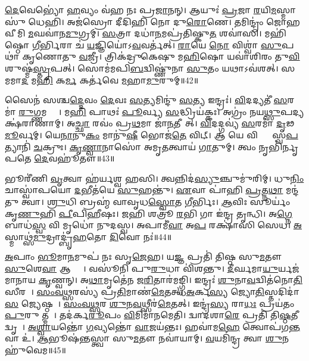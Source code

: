 \ul{𑌦𑍇}𑌵𑍇𑌭𑍍𑌯𑍋॑ \ul{𑌹}𑌵𑍍𑌯𑌂 𑌵॑𑌹 𑌨𑌃 𑌪𑍍𑌰\ul{𑌜𑌾}𑌨𑌨𑍍।
𑌆𑌯𑍁𑌃॑ \ul{𑌪𑍍𑌰}𑌜𑌾 \ul{𑌰}𑌯𑌿\ul{𑌮}𑌸𑍍𑌮𑌾𑌸𑍁॑ 𑌧𑍇𑌹𑌿।
𑌅𑌜॑𑌸𑍍𑌰𑍋 𑌦𑍀𑌦𑌿𑌹𑌿 𑌨𑍋 𑌦𑍁\ul{𑌰𑍋}𑌣𑍇।
𑌤𑌮𑌿𑌨𑍍𑌦𑍍𑌰𑌂॑ 𑌜𑍋𑌹𑌵𑍀𑌮𑌿 \ul{𑌮}𑌘𑌵𑌾॑𑌨\ul{𑌮𑍁}𑌗𑍍𑌰𑌮𑍍।
\ul{𑌸}𑌤𑍍𑌰𑌾 𑌦𑌧𑌾॑\ul{𑌨}𑌮𑌪𑍍𑌰॑𑌤𑌿𑌷𑍍𑌕𑍁\ul{𑌤}\ul{} 𑌶𑌵𑌾॑𑌸𑌿।
𑌮𑌹𑌿॑𑌷𑍍𑌠𑍋 \ul{𑌗𑍀}𑌰𑍍𑌭𑌿𑌰𑌾 𑌚॑ \ul{𑌯}𑌜𑍍𑌞𑌿𑌯𑍋॑\-𑌽\ul{𑌵}𑌵𑌰𑍍𑌤॑𑌤𑍍।
\ul{𑌰𑌾}𑌯𑍇 \ul{𑌨𑍋} 𑌵𑌿𑌶𑍍𑌵𑌾॑ \ul{𑌸𑍁}𑌪𑌥𑌾॑ 𑌕𑍃𑌣𑍋𑌤𑍁 \ul{𑌵}𑌜𑍍𑌰𑍀।
𑌤𑍍𑌰𑌿𑌕॑𑌦𑍍𑌰𑍁𑌕𑍇𑌷𑍁 𑌮\ul{𑌹𑌿}𑌷𑍋 𑌯𑌵𑌾॑𑌶𑌿𑌰𑌂 𑌤𑍁\ul{𑌵𑌿}𑌶𑍁𑌷𑍍𑌮॑\ul{𑌸𑍍𑌤𑍃}𑌪𑌤𑍍।
𑌸𑍋𑌮॑𑌮𑌪𑌿\ul{𑌬}𑌦𑍍𑌵𑌿𑌷𑍍𑌣𑍁॑𑌨𑌾 \ul{𑌸𑍁}𑌤𑌂 𑌯𑌥𑌾\-𑌽𑌵॑𑌶𑌤𑍍।
𑌸 𑌈𑌂᳚ 𑌮𑌮𑌾\ul{𑌦} 𑌮\ul{𑌹𑌿} 𑌕\ul{𑌰𑍍𑌮} 𑌕𑌰𑍍𑌤॑𑌵𑍇 \ul{𑌮}𑌹𑌾\ul{𑌮𑍁}𑌰𑍁𑌮𑍍॥42॥

𑌸𑍈𑌨॑ 𑌸𑌶𑍍𑌚\ul{𑌦𑍍𑌦𑍇}𑌵𑌂 \ul{𑌦𑍇}𑌵𑌃 \ul{𑌸}𑌤𑍍𑌯𑌮𑌿𑌨𑍍𑌦𑍁॑ \ul{𑌸}𑌤𑍍𑌯 𑌇𑌨𑍍𑌦𑍍𑌰𑌃॑।
\ul{𑌵𑌿}𑌦𑌦𑍍𑌯𑌤𑍀॑ \ul{𑌸}𑌰𑌮𑌾॑ \ul{𑌰𑍁}𑌗𑍍𑌣𑌮𑌦𑍍𑌰𑍇𑌃᳚।
𑌮\ul{𑌹𑌿} 𑌪𑌾𑌥𑌃॑ \ul{𑌪𑍂}𑌰𑍍𑌵𑍍𑌯 \ul{𑌸}𑌦𑍍𑌧𑍍𑌰𑌿𑌯॑𑌕𑍍𑌕𑌃।
𑌅𑌗𑍍𑌰𑌂॑ 𑌨𑌯\ul{𑌥𑍍𑌸𑍁}𑌪𑌦𑍍𑌯𑌕𑍍𑌷॑𑌰𑌾𑌣𑌾𑌮𑍍।
𑌅\ul{𑌚𑍍𑌛𑌾} 𑌰𑌵𑌂॑ 𑌪𑍍𑌰\ul{𑌥}𑌮𑌾 𑌜𑌾॑\ul{𑌨}𑌤𑍀𑌗𑌾᳚𑌤𑍍।
\ul{𑌵𑌿}𑌦𑌦𑍍𑌗𑌵𑍍𑌯॑ \ul{𑌸}𑌰𑌮𑌾॑ \ul{𑌦𑍃}𑌢\ul{𑌮𑍂}𑌰𑍍𑌵𑌮𑍍।
𑌯𑍇\ul{𑌨𑌾}𑌨𑍁\ul{𑌕𑌂} 𑌮𑌾𑌨𑍁॑\ul{𑌷𑍀} 𑌭𑍋𑌜॑\ul{𑌤𑍇} 𑌵𑌿𑌟𑍍।
𑌆 𑌯𑍇 𑌵𑌿𑌶𑍍𑌵𑌾𑌃᳚ 𑌸𑍍𑌵\ul{𑌪}𑌤𑍍𑌯𑌾𑌨𑌿॑ \ul{𑌚}𑌕𑍍𑌰𑍁𑌃।
\ul{𑌕𑍃}\ul{𑌣𑍍𑌵𑌾}𑌨𑌾𑌸𑍋॑ 𑌅𑌮𑍃\ul{𑌤}𑌤𑍍𑌵𑌾𑌯॑ \ul{𑌗𑌾}𑌤𑍁𑌮𑍍।
𑌤𑍍𑌵𑌂 𑌨𑍃𑌭𑌿॑𑌰𑍍𑌨𑍃𑌪𑌤𑍇 \ul{𑌦𑍇}𑌵𑌹𑍂॑𑌤𑍗॥43॥

𑌭𑍂𑌰𑍀॑𑌣𑌿 \ul{𑌵𑍃}𑌤𑍍𑌵𑌾 𑌹॑𑌰𑍍𑌯𑌶𑍍𑌵 𑌹𑌸𑌿।
𑌤𑍍𑌵𑌨𑍍𑌨𑌿𑌦॑\ul{𑌸𑍍𑌯𑍁}𑌞𑍍𑌚𑍁𑌮𑍁॑𑌰𑌿𑌮𑍍।
𑌧𑍁\ul{𑌨𑌿𑌂} 𑌚𑌾𑌸𑍍𑌵𑌾॑𑌪𑌯𑍋 \ul{𑌦}𑌭𑍀𑌤॑𑌯𑍇 \ul{𑌸𑍁}𑌹𑌨𑍍𑌤𑍁॑।
\ul{𑌏}𑌵𑌾 𑌪𑌾॑𑌹𑌿 \ul{𑌪𑍍𑌰}𑌤𑍍𑌨\ul{𑌥𑌾} 𑌮𑌨𑍍𑌦॑𑌤𑍁 𑌤𑍍𑌵𑌾।
\ul{𑌶𑍍𑌰𑍁}𑌧𑌿 𑌬𑍍𑌰𑌹𑍍𑌮॑ 𑌵𑌾𑌵𑍃𑌧\ul{𑌸𑍍𑌵𑍋}𑌤 \ul{𑌗𑍀}𑌰𑍍𑌭𑌿𑌃।
\ul{𑌆}𑌵𑌿𑌃 𑌸𑍂𑌰𑍍𑌯𑌂॑ 𑌕𑍃\ul{𑌣𑍁}𑌹𑌿 \ul{𑌪𑍀}𑌪𑌿\ul{𑌹𑍀}𑌷𑌃।
\ul{𑌜}𑌹𑌿 𑌶𑌤𑍍𑌰𑍂॑ \ul{𑌰}𑌭𑌿 𑌗𑌾 𑌇॑𑌨𑍍𑌦𑍍𑌰 𑌤𑍃𑌨𑍍𑌧𑌿।
𑌅\ul{𑌗𑍍𑌨𑍇} 𑌬𑌾𑌧॑\ul{𑌸𑍍𑌵} 𑌵𑌿 𑌮𑍃𑌧𑍋॑ 𑌨𑍁𑌦𑌸𑍍𑌵।
𑌅𑌪𑌾𑌮𑍀॑\ul{𑌵𑌾} 𑌅\ul{𑌪} 𑌰𑌕𑍍𑌷𑌾॑𑌸𑌿 𑌸𑍇𑌧।
\ul{𑌅}𑌸𑍍𑌮𑌾𑌥𑍍𑌸॑\ul{𑌮𑍁}𑌦𑍍𑌰𑌾𑌦𑍍𑌬𑍃॑\ul{𑌹}𑌤𑍋 \ul{𑌦𑌿}𑌵𑍋 𑌨𑌃॑॥44॥

\ul{𑌅}𑌪𑌾𑌂 \ul{𑌭𑍂}𑌮𑌾\ul{𑌨}𑌮𑍁𑌪॑ 𑌨𑌃 𑌸𑍃\ul{𑌜𑍇}𑌹।
𑌯\ul{𑌜𑍍𑌞} 𑌪𑍍𑌰𑌤𑌿॑ 𑌤𑌿𑌷𑍍𑌠 𑌸𑍁\ul{𑌮}𑌤𑍗 \ul{𑌸𑍁}𑌶𑍇\ul{𑌵𑌾} 𑌆 𑌤𑍍𑌵𑌾᳚।
𑌵𑌸𑍂॑𑌨𑌿 𑌪𑍁\ul{𑌰𑍁}𑌧𑌾 𑌵𑌿॑𑌶𑌨𑍍𑌤𑍁।
\ul{𑌦𑍀}𑌰𑍍𑌘𑌮𑌾\ul{𑌯𑍁}𑌰𑍍𑌯𑌜॑𑌮𑌾𑌨𑌾𑌯 \ul{𑌕𑍃}𑌣𑍍𑌵𑌨𑍍।
𑌅\ul{𑌥𑌾}𑌮𑍃𑌤𑍇॑𑌨 𑌜\ul{𑌰𑌿}𑌤𑌾𑌰॑𑌮𑌙𑍍𑌗𑍍𑌧𑌿।
𑌇𑌨𑍍𑌦𑍍𑌰𑌃॑ \ul{𑌶𑍁}𑌨𑌾\ul{𑌵}𑌦𑍍𑌵𑌿𑌤॑𑌨𑍋\ul{𑌤𑌿} 𑌸𑍀𑌰𑌮𑍍᳚।
\ul{𑌸𑌂}\ul{𑌵}\ul{𑌥𑍍𑌸}𑌰𑌸𑍍𑌯॑ 𑌪𑍍𑌰\ul{𑌤𑌿}𑌮𑌾𑌣॑\ul{𑌮𑍇}𑌤𑌤𑍍।
\ul{𑌅}𑌰𑍍𑌕\ul{𑌸𑍍𑌯} 𑌜𑍍𑌯𑍋\ul{𑌤𑌿}𑌸𑍍𑌤𑌦𑌿𑌦𑌾॑\ul{𑌸} 𑌜𑍍𑌯𑍇𑌷𑍍𑌠𑌮𑍍᳚।
\ul{𑌸𑌂}\ul{𑌵}\ul{𑌥𑍍𑌸}𑌰 \ul{𑌶𑍁}𑌨\ul{𑌵}𑌥𑍍𑌸𑍀𑌰॑\ul{𑌮𑍇}𑌤𑌤𑍍।
𑌇𑌨𑍍𑌦𑍍𑌰॑\ul{𑌸𑍍𑌯} 𑌰𑌾\ul{𑌧𑌃} 𑌪𑍍𑌰𑌯॑𑌤𑌂 \ul{𑌪𑍁}𑌰𑍁 𑌤𑍍𑌮𑌨𑌾᳚।
𑌤𑌦॑𑌰𑍍𑌕\ul{𑌰𑍂}𑌪𑌂 \ul{𑌵𑌿}𑌮𑌿𑌮𑌾॑𑌨𑌮𑍇𑌤𑌿।
𑌦𑍍𑌵𑌾𑌦॑𑌶𑌾\ul{𑌰𑍇} 𑌪𑍍𑌰𑌤𑌿॑ 𑌤𑌿\ul{𑌷𑍍𑌠}𑌤𑍀𑌦𑍍𑌵𑍃𑌷𑌾᳚।
\ul{𑌅}\ul{𑌶𑍍𑌵𑌾}𑌯𑌨𑍍𑌤𑍋॑ \ul{𑌗}𑌵𑍍𑌯𑌨𑍍𑌤𑍋॑ \ul{𑌵𑌾}𑌜𑌯॑𑌨𑍍𑌤𑌃।
𑌹𑌵𑌾॑𑌮\ul{𑌹𑍇} 𑌤𑍍𑌵𑍋𑌪॑𑌗\ul{𑌨𑍍𑌤}𑌵𑌾 𑌉॑।
\ul{𑌆}𑌭𑍂𑌷॑𑌨𑍍𑌤𑌸𑍍𑌤𑍍𑌵𑌾 𑌸𑍁\ul{𑌮}𑌤𑍗 𑌨𑌵𑌾॑𑌯𑌾𑌮𑍍।
\ul{𑌵}𑌯𑌮𑌿॑𑌨𑍍𑌦𑍍𑌰 𑌤𑍍𑌵𑌾 \ul{𑌶𑍁}𑌨 𑌹𑍁॑𑌵𑍇𑌮॥45॥




